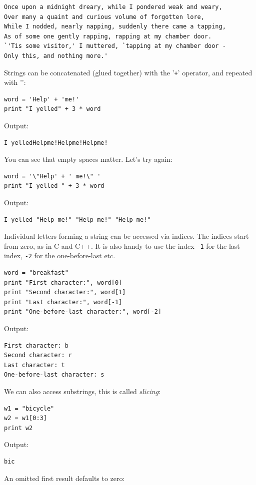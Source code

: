 \documentclass[article,A4,12pt]{llncs}
\begin{document}
\begin{verbatim}
Once upon a midnight dreary, while I pondered weak and weary,
Over many a quaint and curious volume of forgotten lore,
While I nodded, nearly napping, suddenly there came a tapping,
As of some one gently rapping, rapping at my chamber door.
`'Tis some visitor,' I muttered, `tapping at my chamber door -
Only this, and nothing more.'
\end{verbatim}
Strings can be concatenated (glued together) with the '{\tt +}' operator, and repeated with '{\tt *}':

\begin{verbatim}
word = 'Help' + 'me!'
print "I yelled" + 3 * word
\end{verbatim}
Output:

\begin{verbatim}
I yelledHelpme!Helpme!Helpme!
\end{verbatim}
You can see that empty spaces matter. Let's try again:

\begin{verbatim}
word = '\"Help' + ' me!\" '
print "I yelled " + 3 * word
\end{verbatim}
Output:

\begin{verbatim}
I yelled "Help me!" "Help me!" "Help me!"
\end{verbatim}
Individual letters forming a string can be accessed via indices. The indices 
start from zero, as in C and C++. It is also handy to use the index {\tt -1} 
for the last index, {\tt -2} for the one-before-last etc.


\begin{verbatim}
word = "breakfast"
print "First character:", word[0]
print "Second character:", word[1]
print "Last character:", word[-1]
print "One-before-last character:", word[-2]
\end{verbatim}
Output:

\begin{verbatim}
First character: b
Second character: r
Last character: t
One-before-last character: s
\end{verbatim}
We can also access substrings, this is called {\em slicing}:

\begin{verbatim}
w1 = "bicycle"
w2 = w1[0:3]
print w2
\end{verbatim}
Output:

\begin{verbatim}
bic
\end{verbatim}
An omitted first result defaults to zero:
\end{document}
